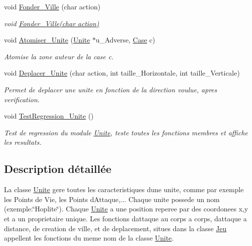 \begin{DoxyCompactItemize}
void \hyperlink{classUnite_a52c4b262930ba270327ba3d9741d2c08}{Fonder\+\_\+\+Ville} (char action)
\begin{DoxyCompactList}\small\item\em void \hyperlink{classUnite_a52c4b262930ba270327ba3d9741d2c08}{Fonder\+\_\+\+Ville(char action)} \end{DoxyCompactList}\item 
void \hyperlink{classUnite_ab4a981ed28ae5c8fcdbbf265fa01634a}{Atomiser\+\_\+\+Unite} (\hyperlink{classUnite}{Unite} $\ast$u\+\_\+\+Adverse, \hyperlink{classCase}{Case} c)
\begin{DoxyCompactList}\small\item\em Atomise la zone auteur de la case c. \end{DoxyCompactList}\item 
void \hyperlink{classUnite_aebf5256ee817c332f1ff9d1874b4b35b}{Deplacer\+\_\+\+Unite} (char action, int taille\+\_\+\+Horizontale, int taille\+\_\+\+Verticale)
\begin{DoxyCompactList}\small\item\em Permet de deplacer une unite en fonction de la direction voulue, apres verification. \end{DoxyCompactList}\item 
void \hyperlink{classUnite_aae3d57c6776d835481c875ba22c73961}{Test\+Regression\+\_\+\+Unite} ()
\begin{DoxyCompactList}\small\item\em Test de regression du module \hyperlink{classUnite}{Unite}, teste toutes les fonctions membres et affiche les resultats. \end{DoxyCompactList}\end{DoxyCompactItemize}


\subsection{Description détaillée}
La classe \hyperlink{classUnite}{Unite} gere toutes les caracteristiques d\textquotesingle{}une unite, comme par exemple les Points de Vie, les Points d\textquotesingle{}Attaque,... Chaque unite possede un nom (exemple\+:\char`\"{}\+Hoplite\char`\"{}). Chaque \hyperlink{classUnite}{Unite} a une position reperee par des coordonees x,y et a un proprietaire unique. Les fonctions d\textquotesingle{}attaque au corps a corps, d\textquotesingle{}attaque a distance, de creation de ville, et de deplacement, situes dans la classe \hyperlink{classJeu}{Jeu} appellent les fonctions du meme nom de la classe \hyperlink{classUnite}{Unite}. 

